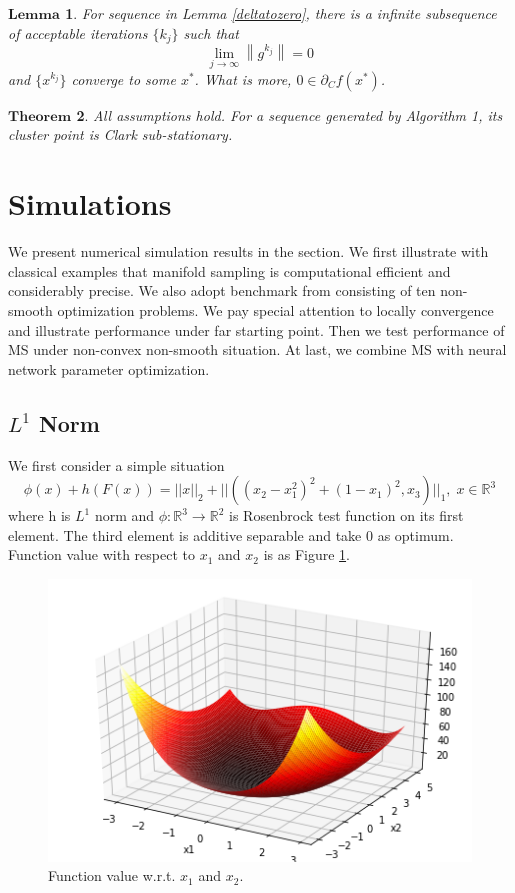 \documentclass[10pt, oneside]{article}
\newtheorem{thm}{$\mathbf{Theorem}$}[section]
\newtheorem{lem}[thm]{$\mathbf{Lemma}$}
\begin{document}
\begin{lem}
\label{substationary}
For sequence in Lemma \ref{deltatozero}, there is a infinite subsequence of acceptable iterations $\{k_j\}$ such that 
$$
\lim _{j \rightarrow \infty}\left\|g^{k_{j}}\right\|=0
$$
and $\{x^{k_j}\}$ converge to some $x^*$. What is more, $0\in \partial_Cf(x^*)$.
\end{lem}


\begin{thm}
\label{mainthm}
All assumptions hold. For a sequence generated by Algorithm 1, its cluster point is Clark sub-stationary. 
\end{thm}

\section{Simulations}
We present numerical simulation results in the section. We first illustrate with classical examples that manifold sampling is computational efficient and considerably precise. We also adopt benchmark from \cite{benchmark} consisting of ten non-smooth optimization problems. We pay special attention to locally convergence and illustrate performance under far starting point. Then we test performance of MS under non-convex non-smooth situation. At last, we combine MS with neural network parameter optimization. 
\subsection{$L^1$ Norm}
We first consider a simple situation
\begin{equation}
\label{testfunc1}
\phi(x)+h(F(x))=||x||_2+||((x_2-x_1^2)^2+(1-x_1)^2,x_3)||_1,\;x\in \mathbb{R}^3
\end{equation}
where h is $L^1$ norm and $\phi : \mathbb{R}^3 \to \mathbb{R}^2 $ is Rosenbrock test function on its first element. The third element is additive separable and take 0 as optimum. Function value with respect to $x_1$ and $x_2$ is as Figure \ref{fig:function}.

\begin{figure}[h]
\centering
\includegraphics[scale=.6]{function.png}
\caption{Function value w.r.t. $x_1$ and $x_2$.}
\label{fig:function}
\end{figure} 
\end{document}
